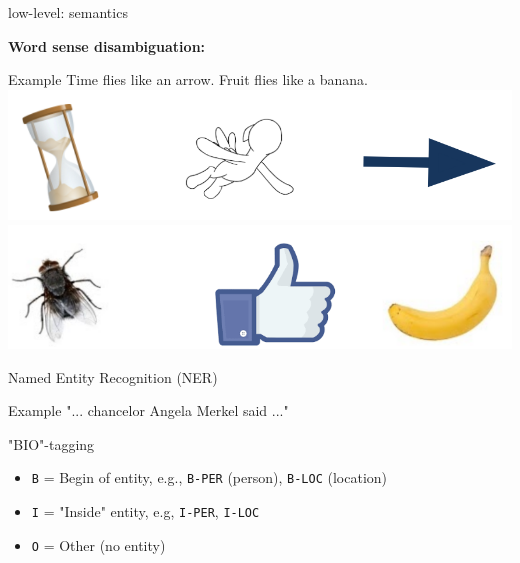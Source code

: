 
\begin{frame}{low-level: semantics}

\vfill

\textbf{Word sense disambiguation:}

	\begin{exampleblock}{Example}
		Time flies   like   an   arrow. \hfil Fruit   flies   like   a   banana. \\
		\includegraphics[width=0.3\linewidth]{figure/timeflies.png} \hspace{5.5em}
		\includegraphics[width=0.3\linewidth]{figure/friutflies.png}
	\end{exampleblock}
	
\vfill

\end{frame}


\begin{frame}{Named Entity Recognition (NER)}

\vfill

\begin{exampleblock}{Example}
"... chancelor Angela Merkel said ..."
\end{exampleblock}

"BIO"-tagging
\begin{itemize}
	\item \texttt{B} = Begin of entity, e.g., \texttt{B-PER} (person), \texttt{B-LOC} (location)
	\item \texttt{I} = "Inside" entity, e.g, \texttt{I-PER}, \texttt{I-LOC}
	\item \texttt{O} = Other (no entity)
\end{itemize}
	
\vfill

\end{frame}


